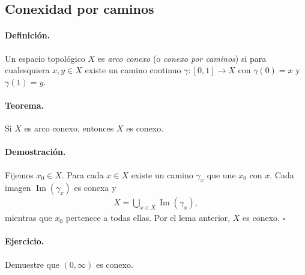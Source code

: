 
\subsection{Conexidad por caminos}

\paragraph{\textbf{Definición.}}
Un espacio topológico $X$ es \emph{arco conexo} (o \emph{conexo por caminos}) si para cualesquiera $x,y\in X$ existe un camino continuo $\gamma\colon[0,1]\to X$ con $\gamma(0)=x$ y $\gamma(1)=y$.

\begin{center}
  \end{center}
  

\paragraph{\textbf{Teorema.}}
Si $X$ es arco conexo, entonces $X$ es conexo.

\paragraph{\textbf{Demostración.}}
Fijemos $x_0\in X$.  
Para cada $x\in X$ existe un camino $\gamma_x$ que une $x_0$ con $x$.  
Cada imagen $\operatorname{Im}(\gamma_x)$ es conexa y
\begin{align*}
X=\bigcup_{x\in X}\operatorname{Im}(\gamma_x),
\end{align*}
mientras que $x_0$ pertenece a todas ellas.  
Por el lema anterior, $X$ es conexo. \hfill$\square$

\paragraph{\textbf{Ejercicio.}}
Demuestre que $(0,\infty)$ es conexo.

